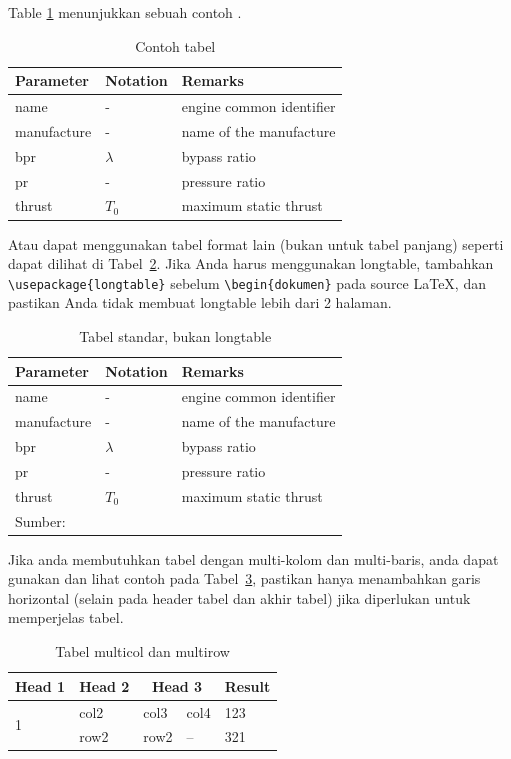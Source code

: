 \documentclass[
 manuscript=article,  %
  layout=publish, 
  year=2024, 
  month= Februari, %
  volume=8,
  number=1 
]{JIKO}
\begin{document}
\blindtext  

Table \ref{tb:example_table} menunjukkan sebuah contoh \cite{Johnson1962,articleLekshmi,Johnson1962,Rikie,Kolodzy}.

\begin{table}[H]
  \centering
  \small
  \caption{Contoh tabel}
  \label{tb:example_table}
  \begin{tabular}{lll}
  \toprule
  \textbf{Parameter} & \textbf{Notation} & \textbf{Remarks} \\
  \midrule
  name & - & engine common identifier \\
  manufacture & - & name of the manufacture  \\
  bpr & $\lambda$ & bypass ratio \\
  pr & - & pressure ratio \\
  thrust & $T_0$ & maximum static thrust\\
  \bottomrule
  \end{tabular}
\end{table}

Atau  dapat menggunakan tabel format lain (bukan untuk tabel panjang) seperti dapat dilihat di Tabel~\ref{standar}. Jika Anda harus menggunakan longtable, tambahkan \verb|\usepackage{longtable}| sebelum \verb|\begin{dokumen}| pada source \LaTeX, dan pastikan Anda tidak membuat longtable lebih dari 2 halaman.
\begin{table}[ht!]
	\centering
	\caption{Tabel standar, bukan longtable}
	\label{standar}
	\begin{tabular}{p{2cm}p{2cm}p{4cm}}\hline
		\textbf{Parameter} & \textbf{Notation} & \textbf{Remarks} \\\hline\hline
	 name & - & engine common identifier \\
	manufacture & - & name of the manufacture  \\
	bpr & $\lambda$ & bypass ratio \\
	pr & - & pressure ratio \\
	thrust & $T_0$ & maximum static thrust\\	\hline
	\multicolumn{3}{l}{{\scriptsize Sumber:\cite{Rikie}}}
	\end{tabular}
\end{table}

Jika anda membutuhkan tabel dengan multi-kolom dan multi-baris, anda dapat gunakan dan lihat contoh pada Tabel~\ref{multitab}, pastikan hanya menambahkan garis horizontal (selain pada header tabel dan akhir tabel) jika diperlukan untuk memperjelas tabel.  
\begin{table}[ht!]
	\centering \caption{Tabel multicol dan multirow} \label{multitab}
	\begin{tabular}{lllll}\hline
		\textbf{Head 1} & \textbf{Head 2} & \multicolumn{2}{c}{\textbf{Head 3}} & \textbf{Result}\\\hline\hline
		\multirow{2}{*}{1}& col2 & col3&col4& 123\\
		 & row2 & row2 & -- & 321\\ \hline
	\end{tabular}
\end{table}
\end{document}
